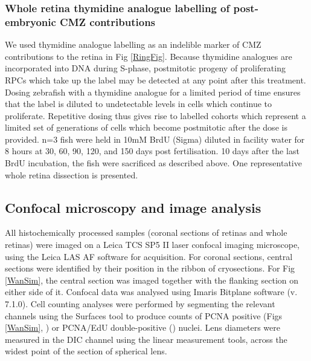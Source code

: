 \subsubsection{Whole retina thymidine analogue labelling of post-embryonic CMZ contributions}
We used thymidine analogue labelling as an indelible marker of CMZ contributions to the retina in Fig \ref{RingFig}. Because thymidine analogues are incorporated into DNA during S-phase, postmitotic progeny of proliferating RPCs which take up the label may be detected at any point after this treatment. Dosing zebrafish with a thymidine analogue for a limited period of time ensures that the label is diluted to undetectable levels in cells which continue to proliferate. Repetitive dosing thus gives rise to labelled cohorts which represent a limited set of generations of cells which become postmitotic after the dose is provided. n=3 fish were held in 10mM BrdU (Sigma) diluted in facility water for 8 hours at 30, 60, 90, 120, and 150 days post fertilisation. 10 days after the last BrdU incubation, the fish were sacrificed as described above. One representative whole retina dissection is presented.

\subsection{Confocal microscopy and image analysis}
All histochemically processed samples (coronal sections of retinas and whole retinas) were imaged on a Leica TCS SP5 II laser confocal imaging microscope, using the Leica LAS AF software for acquisition. For coronal sections, central sections were identified by their position in the ribbon of cryosections. For Fig \ref{WanSim}, the central section was imaged together with the flanking section on either side of it. Confocal data was analysed using Imaris Bitplane software (v. 7.1.0). Cell counting analyses were performed by segmenting the relevant channels using the Surfaces tool to produce counts of PCNA positive (Figs \ref{WanSim}, ) or PCNA/EdU double-positive () nuclei. Lens diameters were measured in the DIC channel using the linear measurement tools, across the widest point of the section of spherical lens.

